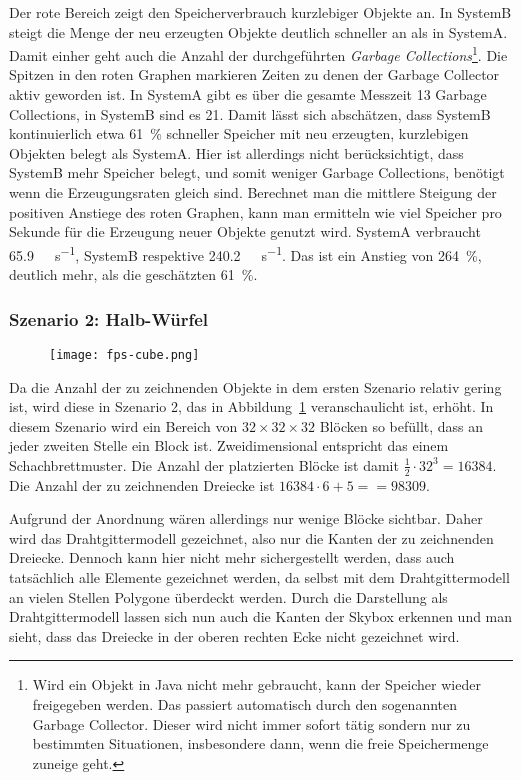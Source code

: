 Der rote Bereich zeigt den Speicherverbrauch kurzlebiger Objekte an. In SystemB steigt die Menge der neu erzeugten Objekte deutlich schneller an als in SystemA. Damit einher geht auch die Anzahl der durchgeführten \emph{Garbage Collections}\footnote{Wird ein Objekt in Java nicht mehr gebraucht, kann der Speicher wieder freigegeben werden. Das passiert automatisch durch den sogenannten Garbage Collector. Dieser wird nicht immer sofort tätig sondern nur zu bestimmten Situationen, insbesondere dann, wenn die freie Speichermenge zuneige geht.}. Die Spitzen in den roten Graphen markieren Zeiten zu denen der Garbage Collector aktiv geworden ist. In SystemA gibt es über die gesamte Messzeit 13 Garbage Collections, in SystemB sind es 21. Damit lässt sich abschätzen, dass SystemB kontinuierlich etwa \SI{61}{\percent} schneller Speicher mit neu erzeugten, kurzlebigen Objekten belegt als SystemA. Hier ist allerdings nicht berücksichtigt, dass SystemB mehr Speicher belegt, und somit  weniger Garbage Collections, benötigt wenn die Erzeugungsraten gleich sind. Berechnet man die mittlere Steigung der positiven Anstiege des roten Graphen, kann man ermitteln wie viel Speicher pro Sekunde für die Erzeugung neuer Objekte genutzt wird. SystemA verbraucht \SI{65,9}{\mega\byte\per\second}, SystemB respektive \SI{240,2}{\mega\byte\per\second}. Das ist ein Anstieg von \SI{264}{\percent}, deutlich mehr, als die geschätzten \SI{61}{\percent}.

\subsubsection{Szenario 2: Halb-Würfel}
\begin{figure}
	\centering
	\texttt{[image: fps-cube.png]}
	\caption{}\label{fig:cube}
\end{figure}
Da die Anzahl der zu zeichnenden Objekte in dem ersten Szenario relativ gering ist, wird diese in Szenario 2, das in Abbildung~\ref{fig:cube} veranschaulicht ist, erhöht. In diesem Szenario wird ein Bereich von $32 \times 32 \times 32$ Blöcken so befüllt, dass an jeder zweiten Stelle ein Block ist. Zweidimensional entspricht das einem Schachbrettmuster. Die Anzahl der platzierten Blöcke ist damit $\frac{1}{2}\cdot32^3 = 16384$. Die Anzahl der zu zeichnenden Dreiecke ist $16384\cdot6 + 5= = 98309$.

Aufgrund der Anordnung wären allerdings nur wenige Blöcke sichtbar. Daher wird das Drahtgittermodell gezeichnet, also nur die Kanten der zu zeichnenden Dreiecke. Dennoch kann hier nicht mehr sichergestellt werden, dass auch tatsächlich alle Elemente gezeichnet werden, da selbst mit dem Drahtgittermodell an vielen Stellen Polygone überdeckt werden. Durch die Darstellung als Drahtgittermodell lassen sich nun auch die Kanten der Skybox erkennen und man sieht, dass das Dreiecke in der oberen rechten Ecke nicht gezeichnet wird. 

